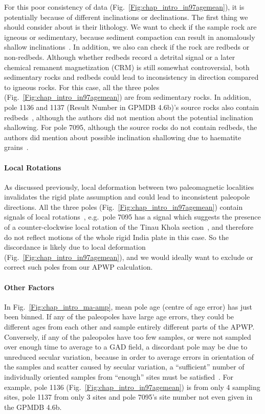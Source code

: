 For this poor consistency of data (Fig.~\ref{Fig:chap_intro_in97agemean}), it
is potentially because of different inclinations or declinations. The first
thing we should consider about is their lithology. We want to check if the
sample rock are igneous or sedimentary, because sediment compaction can result
in anomalously shallow inclinations~\cite{T19}. In addition, we also
can check if the rock are redbeds or non-redbeds. Although whether redbeds
record a detrital signal or a later chemical remanent magnetization (CRM) is
still somewhat controversial, both sedimentary rocks and redbeds could lead to
inconsistency in direction compared to igneous rocks. For this case, all the
three poles (Fig.~\ref{Fig:chap_intro_in97agemean}) are from sedimentary
rocks. In addition, pole 1136 and 1137 (Result Number in GPMDB 4.6b)'s source
rocks also contain redbeds~\cite{O82}, although the authors did not mention
about the potential inclination shallowing. For pole 7095, although the source
rocks do not contain redbeds, the authors did mention about possible inclination
shallowing due to haematite grains~\cite{G94}.

\paragraph{Local Rotations}

As discussed previously, local deformation between two paleomagnetic localities
invalidates the rigid plate assumption and could lead to inconsistent paleopole
directions. All the three poles (Fig.~\ref{Fig:chap_intro_in97agemean})
contain signals of local rotations~\cite{O82,G94}, e.g.\ pole 7095 has a signal
which suggests the presence of a counter-clockwise local rotation of the Tinau
Khola section~\cite{G94}, and therefore do not reflect motions of the whole
rigid India plate in this case. So the discordance is likely due to local
deformation (Fig.~\ref{Fig:chap_intro_in97agemean}), and we would ideally
want to exclude or correct such poles from our APWP calculation.

\paragraph{Other Factors}

In Fig.~\ref{Fig:chap_intro_ma-amp}, mean pole age (centre of age error) has
just been binned. If any of the paleopoles have large age errors, they could be
different ages from each other and sample entirely different parts of the
APWP\@. Conversely, if any of the paleopoles have too few samples, or were not
sampled over enough time to average to a GAD field, a discordant pole may be due
to unreduced secular variation, because in order to average errors in
orientation of the samples and scatter caused by secular variation, a
``sufficient'' number of individually oriented samples from ``enough'' sites
must be satisfied~\cite{T19,v90,B02}. For example, pole 1136
(Fig.~\ref{Fig:chap_intro_in97agemean}) is from only 4 sampling sites, pole 1137
from only 3 sites and pole 7095's site number not even given in the GPMDB 4.6b.

